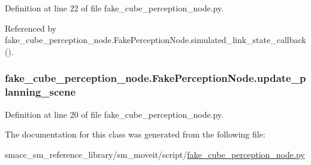 Definition at line 22 of file fake\+\_\+cube\+\_\+perception\+\_\+node.\+py.



Referenced by fake\+\_\+cube\+\_\+perception\+\_\+node.\+Fake\+Perception\+Node.\+simulated\+\_\+link\+\_\+state\+\_\+callback().

\subsubsection[{\texorpdfstring{update\+\_\+planning\+\_\+scene}{update_planning_scene}}]{\setlength{\rightskip}{0pt plus 5cm}fake\+\_\+cube\+\_\+perception\+\_\+node.\+Fake\+Perception\+Node.\+update\+\_\+planning\+\_\+scene}\hypertarget{classfake__cube__perception__node_1_1FakePerceptionNode_a67b87c9f077aefedf69f3e6d9b29ea94}{}\label{classfake__cube__perception__node_1_1FakePerceptionNode_a67b87c9f077aefedf69f3e6d9b29ea94}


Definition at line 20 of file fake\+\_\+cube\+\_\+perception\+\_\+node.\+py.



The documentation for this class was generated from the following file\+:\begin{DoxyCompactItemize}
\item 
smacc\+\_\+sm\+\_\+reference\+\_\+library/sm\+\_\+moveit/script/\hyperlink{fake__cube__perception__node_8py}{fake\+\_\+cube\+\_\+perception\+\_\+node.\+py}\end{DoxyCompactItemize}
